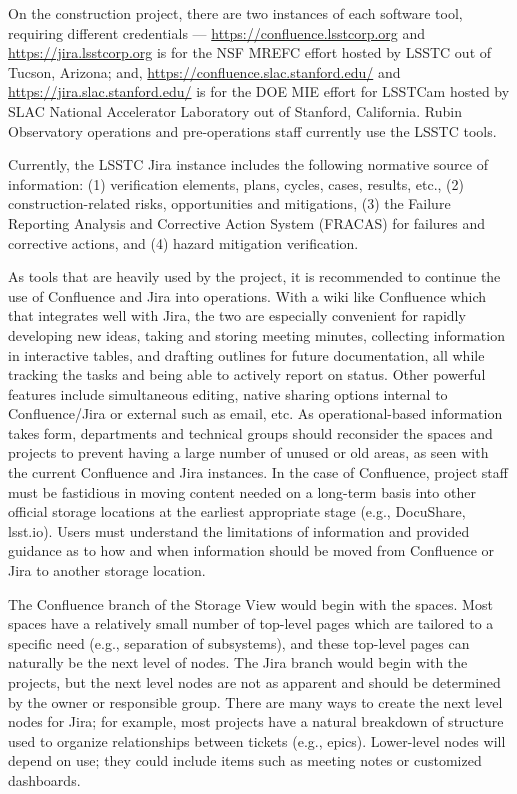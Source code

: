 On the construction project, there are two instances of each software tool, requiring different credentials --- \url{https://confluence.lsstcorp.org} and \url{https://jira.lsstcorp.org} is for the NSF MREFC effort hosted by LSSTC out of Tucson, Arizona; and, \url{https://confluence.slac.stanford.edu/} and \url{https://jira.slac.stanford.edu/} is for the DOE MIE effort for LSSTCam hosted by SLAC National Accelerator Laboratory out of Stanford, California.
Rubin Observatory operations and pre-operations staff currently use the LSSTC tools.

Currently, the LSSTC Jira instance includes the following normative source of information:
(1) verification elements, plans, cycles, cases, results, etc.,
(2) construction-related risks, opportunities and mitigations,
(3) the Failure Reporting Analysis and Corrective Action System (FRACAS) for failures and corrective actions,
and (4) hazard mitigation verification.

As tools that are heavily used by the project, it is recommended to continue the use of Confluence and Jira into operations.
With a wiki like Confluence which that integrates well with Jira, the two are especially convenient for rapidly developing new ideas, taking and storing meeting minutes, collecting information in interactive tables, and drafting outlines for future documentation, all while tracking the tasks and being able to actively report on status.
Other powerful features include simultaneous editing, native sharing options internal to Confluence/Jira or external such as email, etc.
As operational-based information takes form, departments and technical groups should reconsider the spaces and projects to prevent having a large number of unused or old areas, as seen with the current Confluence and Jira instances.
In the case of Confluence, project staff must be fastidious in moving content needed on a long-term basis into other official storage locations at the earliest appropriate stage (e.g., DocuShare, lsst.io).
Users must understand the limitations of information and provided guidance as to how and when information should be moved from Confluence or Jira to another storage location.

The Confluence branch of the Storage View would begin with the spaces.
Most spaces have a relatively small number of top-level pages which are tailored to a specific need (e.g., separation of subsystems), and these top-level pages can naturally be the next level of nodes.
The Jira branch would begin with the projects, but the next level nodes are not as apparent and should be determined by the owner or responsible group.
There are many ways to create the next level nodes for Jira; for example, most projects have a natural breakdown of structure used to organize relationships between tickets (e.g., epics).
Lower-level nodes will depend on use; they could include items such as meeting notes or customized dashboards.


